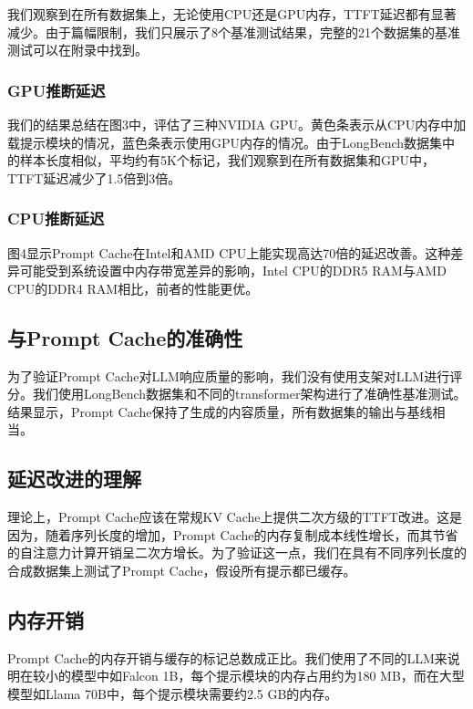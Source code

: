 \documentclass[twocolumn, 10pt]{article} %
\theoremstyle{remark}
\begin{document}
我们观察到在所有数据集上，无论使用CPU还是GPU内存，TTFT延迟都有显著减少。由于篇幅限制，我们只展示了8个基准测试结果，完整的21个数据集的基准测试可以在附录中找到。

\subsubsection{GPU推断延迟}

我们的结果总结在图3中，评估了三种NVIDIA GPU。黄色条表示从CPU内存中加载提示模块的情况，蓝色条表示使用GPU内存的情况。由于LongBench数据集中的样本长度相似，平均约有5K个标记，我们观察到在所有数据集和GPU中，TTFT延迟减少了1.5倍到3倍。

\subsubsection{CPU推断延迟}

图4显示Prompt Cache在Intel和AMD CPU上能实现高达70倍的延迟改善。这种差异可能受到系统设置中内存带宽差异的影响，Intel CPU的DDR5 RAM与AMD CPU的DDR4 RAM相比，前者的性能更优。

\subsection{与Prompt Cache的准确性}

为了验证Prompt Cache对LLM响应质量的影响，我们没有使用支架对LLM进行评分。我们使用LongBench数据集和不同的transformer架构进行了准确性基准测试。结果显示，Prompt Cache保持了生成的内容质量，所有数据集的输出与基线相当。

\subsection{延迟改进的理解}

理论上，Prompt Cache应该在常规KV Cache上提供二次方级的TTFT改进。这是因为，随着序列长度的增加，Prompt Cache的内存复制成本线性增长，而其节省的自注意力计算开销呈二次方增长。为了验证这一点，我们在具有不同序列长度的合成数据集上测试了Prompt Cache，假设所有提示都已缓存。

\subsection{内存开销}

Prompt Cache的内存开销与缓存的标记总数成正比。我们使用了不同的LLM来说明在较小的模型中如Falcon 1B，每个提示模块的内存占用约为180 MB，而在大型模型如Llama 70B中，每个提示模块需要约2.5 GB的内存。
\end{document}
